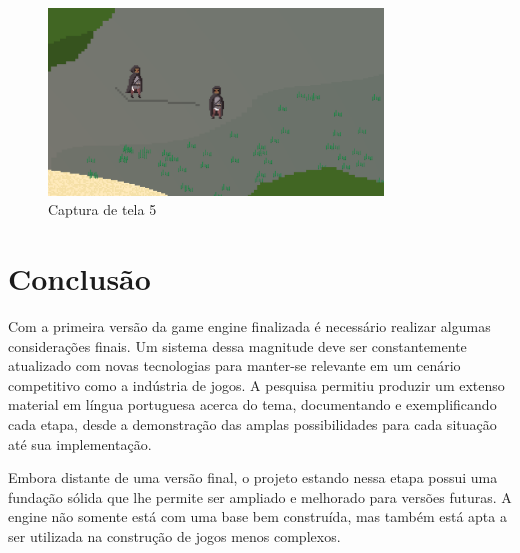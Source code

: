 \documentclass[12pt, 
openright, 
oneside, 
a4paper,    
brazil]{facom-ufu-abntex2}
\begin{document}
\begin{figure}[H]
	\centering
	\includegraphics[width=24em]{imagens/ss5.png}
	\caption{Captura de tela 5}
\end{figure}

\chapter{Conclusão}
\label{cap:conclusao}
Com a primeira versão da game engine finalizada é necessário realizar algumas considerações finais. Um sistema dessa magnitude deve ser constantemente atualizado com novas tecnologias para manter-se relevante em um cenário competitivo como a indústria de jogos. A pesquisa permitiu produzir um extenso material em língua portuguesa acerca do tema, documentando e exemplificando cada etapa, desde a demonstração das amplas possibilidades para cada situação até sua implementação.

Embora distante de uma versão final, o projeto estando nessa etapa possui uma fundação sólida que lhe permite ser ampliado e melhorado para versões futuras. A engine não somente está com uma base bem construída, mas também está apta a ser utilizada na construção de jogos menos complexos.
\end{document}
